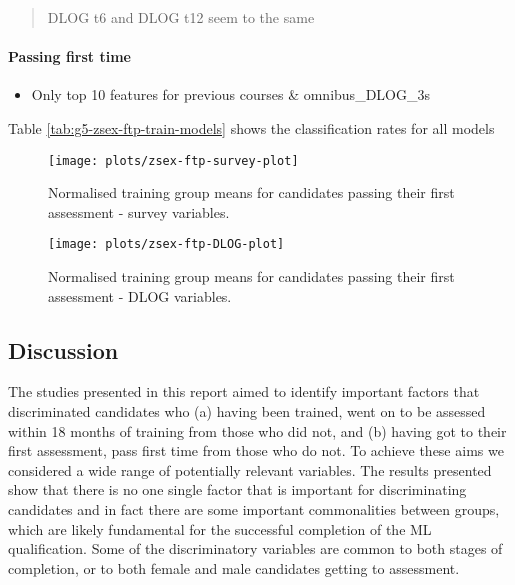 \documentclass[a4paper,]{book}
\providecommand{\tightlist}{%
  \setlength{\itemsep}{0pt}\setlength{\parskip}{0pt}}
\let\oldparagraph\paragraph
\renewcommand{\paragraph}[1]{\oldparagraph{#1}\mbox{}}
\begin{document}
\begin{quote}
DLOG t6 and DLOG t12 seem to the same
\end{quote}

\hypertarget{passing-first-time-1}{%
\paragraph{Passing first time}\label{passing-first-time-1}}

\begin{itemize}
\tightlist
\item
  Only top 10 features for previous courses \& omnibus\_DLOG\_3s
\end{itemize}

Table \ref{tab:g5-zsex-ftp-train-models} shows the classification rates for all models

\begin{figure}
\texttt{[image: plots/zsex-ftp-survey-plot]} \caption{Normalised training group means for candidates passing their first assessment - survey variables.}\label{fig:zsex-ftp-survey-plot-combined}
\end{figure}

\begin{figure}
\texttt{[image: plots/zsex-ftp-DLOG-plot]} \caption{Normalised training group means for candidates passing their first assessment - DLOG variables.}\label{fig:zsex-ftp-DLOG-plot-combined}
\end{figure}

\hypertarget{discussion-1}{%
\subsection{Discussion}\label{discussion-1}}

The studies presented in this report aimed to identify important factors that discriminated candidates who (a) having been trained, went on to be assessed within 18 months of training from those who did not, and (b) having got to their first assessment, pass first time from those who do not. To achieve these aims we considered a wide range of potentially relevant variables. The results presented show that there is no one single factor that is important for discriminating candidates and in fact there are some important commonalities between groups, which are likely fundamental for the successful completion of the ML qualification. Some of the discriminatory variables are common to both stages of completion, or to both female and male candidates getting to assessment.
\end{document}
